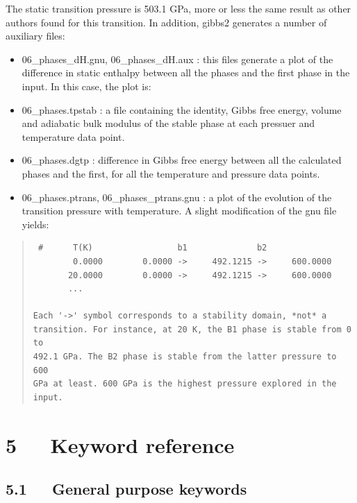 \documentclass[a4paper]{article}
\begin{document}
The static transition pressure is 503.1 GPa, more or less the same
result as other authors found for this transition. In addition, gibbs2
generates a number of auxiliary files:
%
\begin{itemize}

\item 06\_phases\_dH.gnu, 06\_phases\_dH.aux : this files generate a plot of
the difference in static enthalpy between all the phases and the
first phase in the input. In this case, the plot is:

\end{itemize}
%
\begin{itemize}

\item 06\_phases.tpstab : a file containing the identity, Gibbs free
energy, volume and adiabatic bulk modulus of the stable phase at
each pressuer and temperature data point.

\item 06\_phases.dgtp : difference in Gibbs free energy between all the
calculated phases and the first, for all the temperature and
pressure data points.

\item 06\_phases.ptrans, 06\_phases\_ptrans.gnu : a plot of the evolution of
the transition pressure with temperature. A slight modification of
the gnu file yields:

\end{itemize}
%
\begin{quote}
\begin{verbatim}
 #      T(K)                 b1              b2
        0.0000        0.0000 ->     492.1215 ->     600.0000
       20.0000        0.0000 ->     492.1215 ->     600.0000
       ...

Each '->' symbol corresponds to a stability domain, *not* a
transition. For instance, at 20 K, the B1 phase is stable from 0 to
492.1 GPa. The B2 phase is stable from the latter pressure to 600
GPa at least. 600 GPa is the highest pressure explored in the input.
\end{verbatim}
\end{quote}


\section{5~~~Keyword reference%
  \label{keyword-reference}%
}


\subsection{5.1~~~General purpose keywords%
  \label{general-purpose-keywords}%
}
\end{document}
